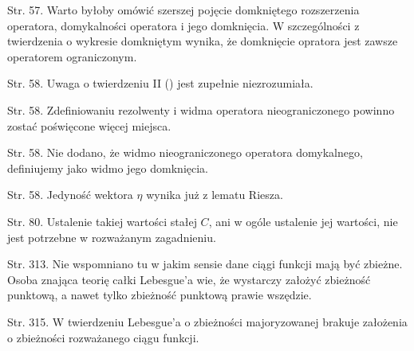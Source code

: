 \documentclass[a4paper,11pt]{article}
\begin{document}
 Str. 57. Warto byłoby omówić szerszej pojęcie domkniętego
  rozszerzenia operatora, domykalności operatora i jego domknięcia. W
  szczególności z twierdzenia o wykresie domkniętym wynika, że
  domknięcie opratora jest zawsze operatorem ograniczonym.

 Str. 58. Uwaga o twierdzeniu II () jest zupełnie
  niezrozumiała.

 Str. 58. Zdefiniowaniu rezolwenty i widma operatora
  nieograniczonego powinno zostać poświęcone więcej miejsca.

 Str. 58. Nie dodano, że widmo nieograniczonego operatora
  domykalnego, definiujemy jako widmo jego domknięcia.

 Str. 58. Jedyność wektora $\eta$ wynika już z lematu Riesza.

 Str. 80. Ustalenie takiej wartości stałej $C$, ani w ogóle
  ustalenie jej wartości, nie jest potrzebne w rozważanym zagadnieniu.

 Str. 313. Nie wspomniano tu w jakim sensie dane ciągi funkcji
  mają być zbieżne. Osoba znająca teorię całki Lebesgue'a wie, że
  wystarczy założyć zbieżność punktową, a nawet tylko zbieżność
  punktową prawie wszędzie.

 Str. 315. W twierdzeniu Lebesgue'a o zbieżności majoryzowanej
  brakuje założenia o zbieżności rozważanego ciągu funkcji.




\end{document}

